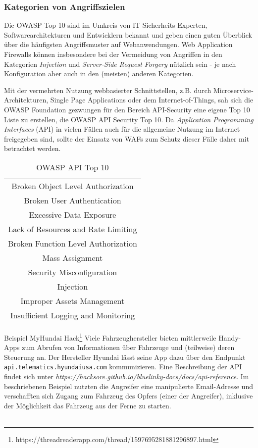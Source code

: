 \subsubsection{Kategorien von Angriffszielen}

Die OWASP Top 10 sind im Umkreis von IT-Sicherheits-Experten, Softwarearchitekturen und Entwicklern bekannt und geben einen guten Überblick über die häufigsten Angriffsmuster auf Webanwendungen. Web Application Firewalls können insbesondere bei der Vermeidung von Angriffen in den Kategorien \emph{Injection} und \emph{Server-Side Request Forgery} nützlich sein - je nach Konfiguration aber auch in den (meisten) anderen Kategorien.  

Mit der vermehrten Nutzung webbasierter Schnittstellen, z.B. durch Microservice-Architekturen, Single Page Applications oder dem Internet-of-Things, sah sich die OWASP Foundation gezwungen für den Bereich API-Security eine eigene Top 10 Liste zu erstellen, die OWASP API Security Top 10\cite{owaspapi10}. Da \emph{Application Programming Interfaces} (API) in vielen Fällen auch für die allgemeine Nutzung im Internet freigegeben sind, sollte der Einsatz von WAFs zum Schutz dieser Fälle daher mit betrachtet werden. 

\begin{table}[ht]
    \centering
    \begin{tabular}{|c|}
    \hline
         Broken Object Level Authorization   \\
         Broken User Authentication  \\
         Excessive Data Exposure  \\
         Lack of Resources and Rate Limiting  \\
         Broken Function Level Authorization  \\
         Mass Assignment  \\
         Security Misconfiguration  \\
         Injection  \\
         Improper Assets Management  \\
         Insufficient Logging and Monitoring  \\
         \hline
    \end{tabular}
    \caption{OWASP API Top 10}
    \label{tab:owaspapitop10}
\end{table}

\textcolor{bhtGray}{ Beispiel MyHundai Hack\footnote{https://threadreaderapp.com/thread/1597695281881296897.html}} Viele Fahrzeughersteller bieten mittlerweile Handy-Apps zum Abrufen von Informationen über Fahrzeuge und (teilweise) deren Steuerung an. Der Hersteller Hyundai lässt seine App dazu über den Endpunkt \texttt{api.telematics.hyundaiusa.com} kommunizieren. Eine Beschreibung der API findet sich unter \emph{https://hacksore.github.io/bluelinky-docs/docs/api-reference}. Im beschriebenen Beispiel nutzten die Angreifer eine manipulierte Email-Adresse und verschafften sich Zugang zum Fahrzeug des Opfers (einer der Angreifer), inklusive der Möglichkeit das Fahrzeug aus der Ferne zu starten. \\\\

